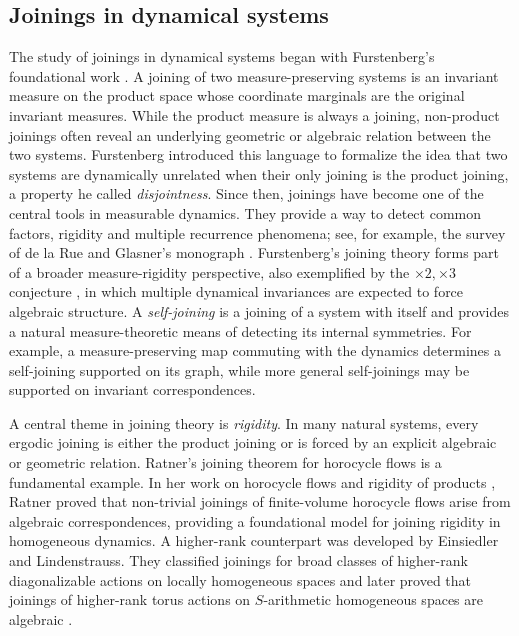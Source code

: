 \documentclass[11pt]{amsart}
\numberwithin{equation}{section}
\theoremstyle{plain}
\theoremstyle{definition}
\theoremstyle{remark}
\begin{document}
\subsection{Joinings in dynamical systems}
The study of joinings in dynamical systems
began with Furstenberg's foundational work \cite{Furstenberg1967}. A joining of two measure-preserving systems is an invariant measure on the product space whose coordinate marginals are the original invariant measures. While the product measure is always a joining, non-product joinings often reveal an underlying geometric or algebraic relation between the two systems. Furstenberg introduced this language to formalize the idea that two systems are dynamically unrelated when their only joining is the product joining, a property he called {\it disjointness}. Since then, joinings have become one of the central tools in measurable dynamics. They provide a way to detect common factors, rigidity and multiple recurrence phenomena; see, for example, the survey of de la Rue \cite{deLaRue2005} and Glasner's monograph \cite{Glasner2003}.
Furstenberg's joining theory forms part of a broader measure-rigidity
perspective, also exemplified by the $\times2,\times3$ conjecture \cite{Furstenberg1967}, in which
multiple dynamical invariances are expected to force algebraic structure.
A \emph{self-joining}
is a joining of a
system with itself and provides a natural measure-theoretic means of detecting
its internal symmetries. For example, a measure-preserving map commuting with
the dynamics determines a self-joining supported on its graph, while more
general self-joinings may be supported on 
invariant correspondences.

A central theme in joining theory is \emph{rigidity}. In many natural
systems, every ergodic joining is either the product joining or is forced by
an explicit algebraic or geometric relation. Ratner's joining theorem for
horocycle flows is a fundamental example. In her work on horocycle flows and
rigidity of products \cite{Ratner1983}, Ratner 
proved that non-trivial
joinings of finite-volume horocycle flows arise from algebraic
correspondences, providing a foundational model for joining rigidity in
homogeneous dynamics.
A higher-rank counterpart was developed by Einsiedler and Lindenstrauss.
They classified joinings for broad classes of higher-rank diagonalizable
actions on locally homogeneous spaces
\cite{EinsiedlerLindenstrauss2007} and later proved that joinings of
higher-rank torus actions on $S$-arithmetic homogeneous spaces are
algebraic \cite{EinsiedlerLindenstrauss2019}.
\end{document}
